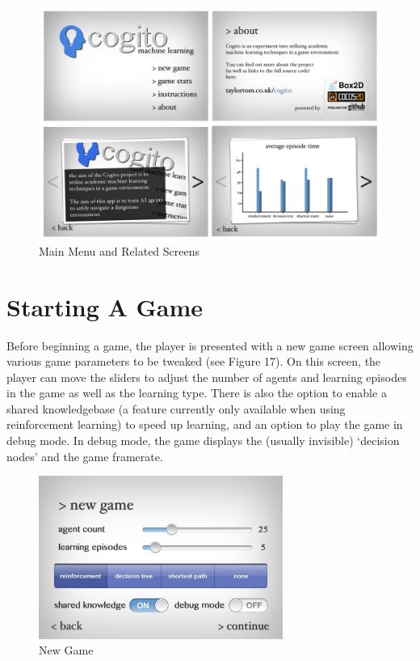 \documentclass[a4paper,oneside]{report}
\begin{document}
\begin{figure}[h!]
  \centering
    \includegraphics[width=120mm]{sources/images/FinalScreens}
    \caption{Main Menu and Related Screens}
\end{figure}

\section{Starting A Game}

Before beginning a game, the player is presented with a new game screen allowing various game parameters to be tweaked (see Figure 17). On this screen, the player can move the sliders to adjust the number of agents and learning episodes in the game as well as the learning type. There is also the option to enable a shared knowledgebase (a feature currently only available when using reinforcement learning) to speed up learning, and an option to play the game in debug mode. In debug mode, the game displays the (usually invisible) `decision nodes' and the game framerate.

\begin{figure}[h!]
  \centering
    \includegraphics[width=80mm]{sources/images/Screen_NewGame}
    \caption{New Game}
\end{figure}
\end{document}
